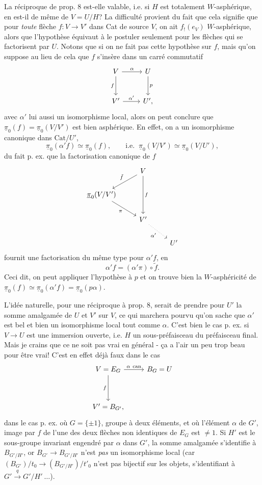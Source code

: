 \documentclass[11pt]{article}
\newcommand{\printedpage}[1]{\marginpar{\footnotesize p.~#1}}
\newcommand{\msp}[1]{\marginpar{\footnotesize [#1]}}
\newcommand{\upi}{\underline{\pi}}
\newcommand{\Cat}{\mathrm{Cat}}
\begin{document}
La réciproque de prop. 8 est-elle valable, i.e. si $H$ est totalement $W$-asphérique, en est-il de même de $V = U/H$? La difficulté provient du fait que cela signifie que pour \textit{toute} flèche $f : V \longrightarrow V'$ dans Cat de source $V$, on ait $f_!(e_V)$ $W$-asphérique, alors que l'hypothèse équivaut à le postuler seulement pour les flèches qui se factorisent par $U$. Notons que si on ne fait pas cette hypothèse sur $f$, mais qu'on suppose au lieu de cela que $f$ s'insère dans un carré commutatif \msp{page 95}
\[
\begin{tikzcd}[row sep=large]
V \arrow[r, "\alpha"] \arrow[d, "f"'] & U \arrow[d, "p"] \\
V' \arrow[r, "\alpha'"] & U',
\end{tikzcd}
\]
avec $\alpha'$ lui aussi un isomorphisme local, alors on peut conclure que $\upi_0(f) = \upi_0(V/V')$ est bien asphérique. En effet, on a un isomorphisme canonique dans $\Cat/U'$,
\[ \upi_0(\alpha'f) \simeq \upi_0(f), \qquad \text{i.e. } \ \upi_0(V/V') \simeq \upi_0(V/U'), \]
du fait p. ex. que la factorisation canonique de $f$
\printedpage{67}
\[
\begin{tikzcd}[row sep=normal]
 & V \arrow[dl, "\tilde{f}"'] \arrow[dd, "f"] & \\
\upi_0(V/V') \arrow[dr, "\pi"'] & & \\
 & V' \arrow[dr, dotted, "\alpha'"'] & \\
 & & U'
\end{tikzcd}
\]
fournit une factorisation du même type pour $\alpha'f$, en
\[ \alpha'f = (\alpha'\pi) \circ \tilde{f}. \]
Ceci dit, on peut appliquer l'hypothèse à $p$ et on trouve bien la $W$-asphéricité de $\upi_0(f) \simeq \upi_0(\alpha'f) = \upi_0(p\alpha)$.

\msp{page 96}
L'idée naturelle, pour une réciproque à prop. 8, serait de prendre pour $U'$ la somme amalgamée de $U$ et $V'$ sur $V$, ce qui marchera pourvu qu'on sache que $\alpha'$ est bel et bien un isomorphisme local tout comme $\alpha$. C'est bien le cas p. ex. si $V \longrightarrow U$ est une immersion ouverte, i.e. $H$ un sous-préfaisceau du préfaisceau final. Mais je crains que ce ne soit pas vrai en général - ça a l'air un peu trop beau pour être vrai! C'est en effet déjà faux dans le cas
\[
\begin{tikzcd}[row sep=huge]
V = E_G \arrow[r, "\alpha\ \text{can}"] \arrow[d, "f"'] & B_G = U \\
V' = B_{G'}, &
\end{tikzcd}
\]
dans le cas p. ex. où $G = \{\pm 1\}$, groupe à deux éléments, et où l'élément $\alpha$ de $G'$, image par $f$ de l'une des deux flèches non identiques de $E_G$ est $\neq 1$. Si $H'$ est le sous-groupe invariant engendré par $\alpha$ dans $G'$, la somme amalgamée s'identifie à $B_{G'/H'}$, or $B_{G'} \longrightarrow B_{G'/H'}$ n'est \textit{pas} un isomorphisme local (car $(B_{G'})/t_0 \longrightarrow (B_{G'/H'})/t'_0$ n'est pas bijectif sur les objets, s'identifiant à $G' \overset{q}{\longrightarrow} G'/H' \ \ldots$).
\end{document}
